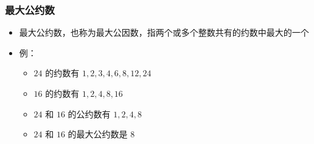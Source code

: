 \begin{frame}[fragile]
    \frametitle{最大公约数}
    \begin{itemize}
        \item 最大公约数，也称为最大公因数，指两个或多个整数共有的约数中最大的一个
        \item 例：
        \begin{itemize}
            \item $24$ 的约数有 $1, 2, 3, 4, 6, 8, 12, 24$
            \item $16$ 的约数有 $1, 2, 4, 8, 16$
            \item $24$ 和 $16$ 的公约数有 $1, 2, 4, 8$
            \item $24$ 和 $16$ 的最大公约数是 $8$
        \end{itemize}
    \end{itemize}

\end{frame}


